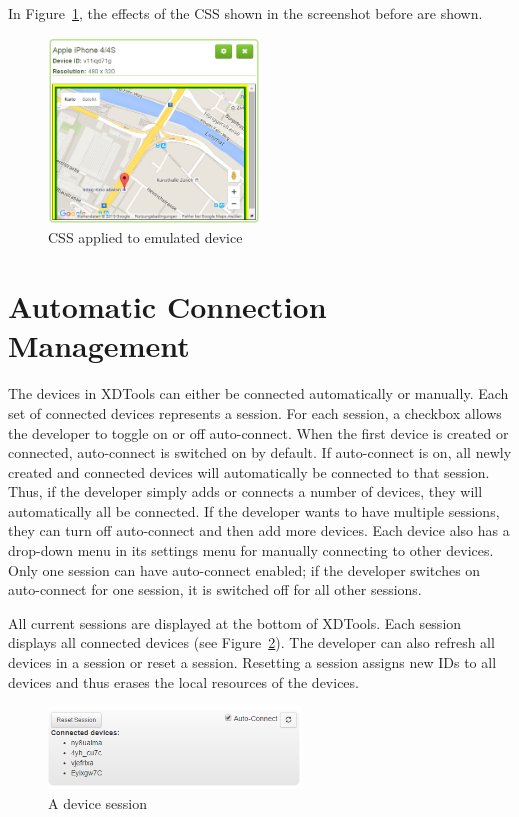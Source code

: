 In Figure~\ref{fig:css_applied}, the effects of the CSS shown in the screenshot before are shown. 

\begin{figure}[H]
  \centering
    \includegraphics[width=0.5\textwidth]{images/screenshots/emulated_device_4.png}
	\caption[Screenshot: CSS effects]{CSS applied to emulated device}
	\label{fig:css_applied}
\end{figure}

\section{Automatic Connection Management}

The devices in XDTools can either be connected automatically or manually. Each set of connected devices represents a session. For each session, a checkbox allows the developer to toggle on or off auto-connect. When the first device is created or connected, auto-connect is switched on by default. If auto-connect is on, all newly created and connected devices will automatically be connected to that session. Thus, if the developer simply adds or connects a number of devices, they will automatically all be connected. If the developer wants to have multiple sessions, they can turn off auto-connect and then add more devices. Each device also has a drop-down menu in its settings menu for manually connecting to other devices. Only one session can have auto-connect enabled; if the developer switches on auto-connect for one session, it is switched off for all other sessions.

All current sessions are displayed at the bottom of XDTools. Each session displays all connected devices (see Figure~\ref{fig:sessions}). The developer can also refresh all devices in a session or reset a session. Resetting a session assigns new IDs to all devices and thus erases the local resources of the devices. 

\begin{figure}[H]
  \centering
    \includegraphics[width=0.6\textwidth]{images/screenshots/session_management.png}
	\caption[Screenshot: Session]{A device session}
	\label{fig:sessions}
\end{figure}

